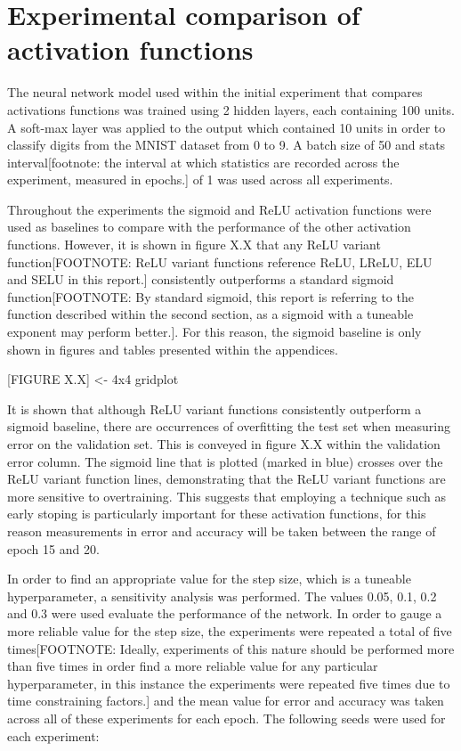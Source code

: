 \documentclass{article}
\begin{document}
\section{Experimental comparison of activation functions}

The neural network model used within the initial experiment that compares activations functions was trained using 2 hidden layers, each containing 100 units. A soft-max layer was applied to the output which contained 10 units in order to classify digits from the MNIST dataset from 0 to 9. A batch size of 50 and stats interval[footnote: the interval at which statistics are recorded across the experiment, measured in epochs.] of 1 was used across all experiments.

Throughout the experiments the sigmoid and ReLU activation functions were used as baselines to compare with the performance of the other activation functions. However, it is shown in figure X.X that any ReLU variant function[FOOTNOTE: ReLU variant functions reference ReLU, LReLU, ELU and SELU in this report.] consistently outperforms a standard sigmoid function[FOOTNOTE: By standard sigmoid, this report is referring to the function described within the second section, as a sigmoid with a tuneable exponent may perform better.]. For this reason, the sigmoid baseline is only shown in figures and tables presented within the appendices.

[FIGURE X.X] <- 4x4 gridplot

It is shown that although ReLU variant functions consistently outperform a sigmoid baseline, there are occurrences of overfitting the test set when measuring error on the validation set. This is conveyed in figure X.X within the validation error column. The sigmoid line that is plotted (marked in blue) crosses over the ReLU variant function lines, demonstrating that the ReLU variant functions are more sensitive to overtraining. This suggests that employing a technique such as early stoping is particularly important for these activation functions, for this reason measurements in error and accuracy will be taken between the range of epoch 15 and 20.

In order to find an appropriate value for the step size, which is a tuneable hyperparameter, a sensitivity analysis was performed. The values 0.05, 0.1, 0.2 and 0.3 were used evaluate the performance of the network. In order to gauge a more reliable value for the step size, the experiments were repeated a total of five times[FOOTNOTE: Ideally, experiments of this nature should be performed more than five times in order find a more reliable value for any particular hyperparameter, in this instance the experiments were repeated five times due to time constraining factors.] and the mean value for error and accuracy was taken across all of these experiments for each epoch. The following seeds were used for each experiment:
\end{document}
